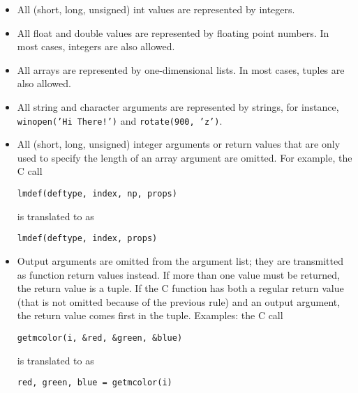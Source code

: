 \begin{itemize}
\item
All (short, long, unsigned) int values are represented by {\Python}
integers.
\item
All float and double values are represented by {\Python} floating point
numbers.
In most cases, {\Python} integers are also allowed.
\item
All arrays are represented by one-dimensional {\Python} lists.
In most cases, tuples are also allowed.
\item
\begin{sloppypar}
All string and character arguments are represented by {\Python} strings,
for instance,
{\tt winopen('Hi~There!')}
and
{\tt rotate(900,~'z')}.
\end{sloppypar}
\item
All (short, long, unsigned) integer arguments or return values that are
only used to specify the length of an array argument are omitted.
For example, the C call
\bcode\begin{verbatim}
lmdef(deftype, index, np, props)
\end{verbatim}\ecode
is translated to {\Python} as
\bcode\begin{verbatim}
lmdef(deftype, index, props)
\end{verbatim}\ecode
\item
Output arguments are omitted from the argument list; they are
transmitted as function return values instead.
If more than one value must be returned, the return value is a tuple.
If the C function has both a regular return value (that is not omitted
because of the previous rule) and an output argument, the return value
comes first in the tuple.
Examples: the C call
\bcode\begin{verbatim}
getmcolor(i, &red, &green, &blue)
\end{verbatim}\ecode
is translated to {\Python} as
\bcode\begin{verbatim}
red, green, blue = getmcolor(i)
\end{verbatim}\ecode
\end{itemize}

